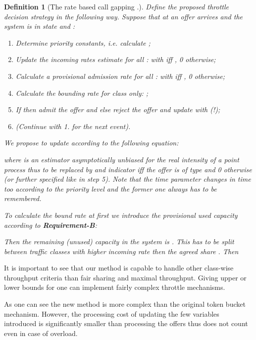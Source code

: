 \documentclass[conference]{IEEEtran}
\newtheorem{definition}{Definition}
\newcommand{\reqB}{\textbf{Requirement-B}}
\begin{document}
\begin{definition}[The rate based call gapping .] Define the proposed throttle decision strategy
 in the following way. Suppose that at  an
\textit{offer} arrives and the system is in state
 and :
\begin{enumerate}
  \item Determine priority constants, i.e. calculate ;
  \item Update the incoming rates estimate for all :
   with  iff , 0 otherwise;
  \item Calculate a provisional admission rate for all :
   with  iff , 0 otherwise;
  \item Calculate the bounding rate for class  only: ;
  \item If  then \textit{admit} the offer and
   else \textit{reject} the
  \textit{offer} and update  with (!);
  \item (Continue with 1. for the next event).
\end{enumerate}

We propose to update 
according to the following equation:

where  is an estimator asymptotically unbiased for
the  real intensity of a point process thus to be
replaced by  and indicator
 iff the \textit{offer} is of type  and 0
otherwise (or further specified like in step 5). Note that the time
parameter  changes in time too according to the priority level
and the former one always has to be remembered.

To calculate the bound rate at first we introduce  the
provisional used capacity according to \reqB:

Then the remaining (unused) capacity in the system is .
This has to be split between traffic classes with higher incoming
rate then the agreed share . Then

\end{definition}

It is important to see that our method is capable to handle other
class-wise throughput criteria than fair sharing and maximal
throughput. Giving upper or lower bounds for  one can implement
fairly complex throttle mechanisms.

As one can see the new method is more complex than the original
token bucket mechanism. However, the processing cost of updating the
few variables introduced is significantly smaller than processing
the offers thus does not count even in case of overload.
\end{document}
